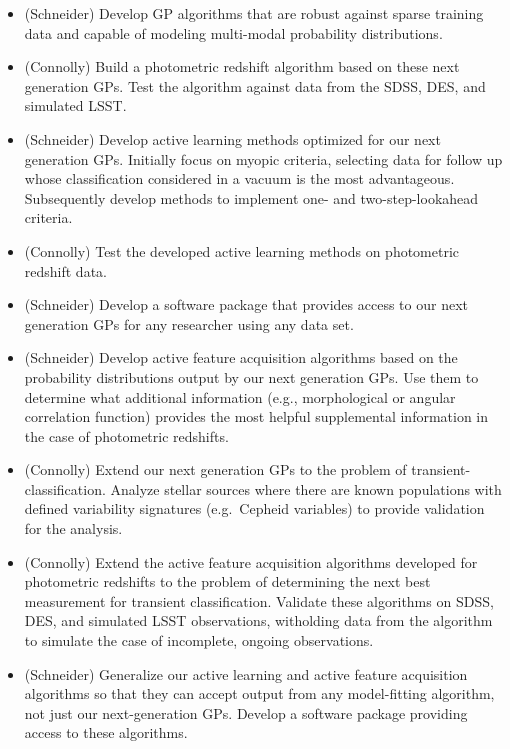 \documentclass[prd,nofootbib,floatfix,11pt,tightenlines]{revtex4}
\begin{document}
\begin{itemize}

\item (Schneider) Develop GP algorithms that are robust against sparse training data and
capable of modeling multi-modal probability
distributions.  

\item (Connolly) Build a photometric redshift algorithm based on these next generation
GPs.  Test the algorithm against data from the SDSS, DES, and simulated LSST.

\item (Schneider) Develop active learning methods optimized for our next generation GPs.
Initially focus on myopic criteria, selecting data for follow up whose classification
considered in a vacuum is the most advantageous.  Subsequently develop methods to implement
one- and two-step-lookahead criteria.

\item (Connolly) Test the developed active learning methods on photometric redshift data.

\item (Schneider) 
Develop a software package that provides access to our next generation GPs for
any researcher using any data set.

\end{itemize}


\begin{itemize}

\item (Schneider)
Develop active feature acquisition algorithms based on the probability distributions
output by our next generation GPs.  Use them to determine what additional
information (e.g., morphological or angular correlation function) provides the most
helpful supplemental information in the case of photometric redshifts.

\item (Connolly) Extend our next generation GPs to the problem of 
transient-classification.  Analyze stellar
 sources where there are known populations with defined variability
 signatures (e.g.\ Cepheid variables) to provide validation for the
 analysis.

\item (Connolly) Extend the active feature acquisition algorithms developed for photometric
redshifts to the problem of determining the next best measurement for transient
classification.
Validate these algorithms on SDSS, DES, and simulated LSST observations, witholding
data from the algorithm to simulate the case of incomplete, ongoing observations.

\item (Schneider) 
Generalize our active learning and active feature acquisition algorithms so that
they can accept output from any model-fitting algorithm, not just our next-generation
GPs.  Develop a software package providing access to these algorithms.

\end{itemize}
\end{document}
